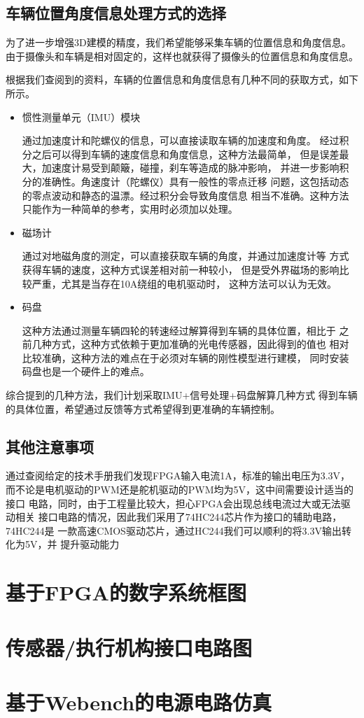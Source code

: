 \documentclass[UTF8,a4paper]{paper}
\begin{document}
\subsection{车辆位置角度信息处理方式的选择}
为了进一步增强3D建模的精度，我们希望能够采集车辆的位置信息和角度信息。
由于摄像头和车辆是相对固定的，这样也就获得了摄像头的位置信息和角度信息。

根据我们查阅到的资料，车辆的位置信息和角度信息有几种不同的获取方式，如下所示。
\begin{itemize}
    \item 惯性测量单元（IMU）模块

    通过加速度计和陀螺仪的信息，可以直接读取车辆的加速度和角度。
    经过积分之后可以得到车辆的速度信息和角度信息，这种方法最简单，
    但是误差最大，加速度计易受到颠簸，碰撞，刹车等造成的脉冲影响，
    并进一步影响积分的准确性。角速度计（陀螺仪）具有一般性的零点迁移
    问题，这包括动态的零点波动和静态的温漂。经过积分会导致角度信息
    相当不准确。这种方法只能作为一种简单的参考，实用时必须加以处理。

    \item 磁场计

    通过对地磁角度的测定，可以直接获取车辆的角度，并通过加速度计等
    方式获得车辆的速度，这种方式误差相对前一种较小，
    但是受外界磁场的影响比较严重，尤其是当存在10A绕组的电机驱动时，
    这种方法可以认为无效。

    \item 码盘

    这种方法通过测量车辆四轮的转速经过解算得到车辆的具体位置，相比于
    之前几种方式，这种方式依赖于更加准确的光电传感器，因此得到的值也
    相对比较准确，这种方法的难点在于必须对车辆的刚性模型进行建模，
    同时安装码盘也是一个硬件上的难点。
\end{itemize}
综合提到的几种方法，我们计划采取IMU+信号处理+码盘解算几种方式
得到车辆的具体位置，希望通过反馈等方式希望得到更准确的车辆控制。

\subsection{其他注意事项}
通过查阅给定的技术手册我们发现FPGA输入电流1A，标准的输出电压为3.3V，
而不论是电机驱动的PWM还是舵机驱动的PWM均为5V，这中间需要设计适当的接口
电路，同时，由于工程量比较大，担心FPGA会出现总线电流过大或无法驱动相关
接口电路的情况，因此我们采用了74HC244芯片作为接口的辅助电路，74HC244是
一款高速CMOS驱动芯片，通过HC244我们可以顺利的将3.3V输出转化为5V，并
提升驱动能力
\section{基于FPGA的数字系统框图}
\section{传感器/执行机构接口电路图}
\section{基于Webench的电源电路仿真}
\end{document}
